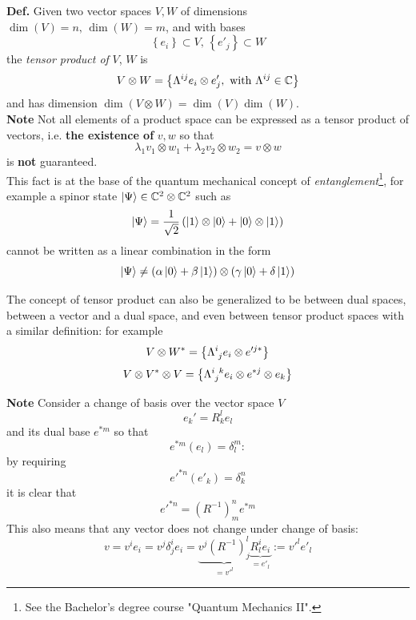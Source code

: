 \textbf{Def.} Given two vector spaces $V,W$ of dimensions $\dim(V)=n,\,\dim(W)=m$,
and with bases
$$\left\{e_i\right\}\subset V,\,\left\{e'_j\right\}\subset W$$
the \textit{tensor product of} $V$, $W$ is
$$V\otimes W = \left\{\Lambda\indices{^i^j}e_i\otimes e_j',\text{ with }
\Lambda^{ij}\in\mathbb{C}\right\}$$
and has dimension $\dim(V\otimes W) = \dim(V)\dim(W)$.\\
\textbf{Note} Not all elements of a product space can be expressed as a tensor
product of vectors, i.e. \textbf{the existence of} $v,w$ so that
$$\lambda_1v_1\otimes w_1 + \lambda_2v_2\otimes w_2 = v\otimes w$$
is \textbf{not} guaranteed.\\
This fact is at the base of the quantum mechanical
concept of \textit{entanglement}\footnote{
See the Bachelor's degree course "Quantum Mechanics II".},
for example a spinor state
$\ket{\Psi}\in\mathbb{C}^2\otimes\mathbb{C}^2$ such as
$$\ket{\Psi} = \frac{1}{\sqrt{2}}\left(\ket{1}\otimes\ket{0}+\ket{0}\otimes\ket{1}
\right)$$
cannot be written as a linear combination in the form
$$\ket{\Psi}\neq \left(\alpha\ket{0}+\beta\ket{1}\right)\otimes(\gamma\ket{0}+
\delta\ket{1})$$

The concept of tensor product can also be generalized to be between dual
spaces, between a vector and a dual space, and even between tensor product spaces
with a similar definition: for example
$$V\otimes W^* = \left\{\Lambda\indices{^i_j}e_i\otimes e'^{j*}\right\}$$
$$V\otimes V^*\otimes V = \left\{\Lambda\indices{^i_j^k}e_i\otimes e^{*j}\otimes
e_k\right\}$$

\textbf{Note} Consider a change of basis over the vector space $V$
$$e_k' = R^l_ke_l$$
and its dual base $e^{*m}$ so that
$$e^{*m}(e_l)=\delta^m_l:$$
by requiring
$$e'^{*n}(e'_k) = \delta^n_k$$
it is clear that
$$e'^{*n} = (R^{-1})^n_me^{*m}$$
This also means that any vector does not change under change of basis:
$$v = v^ie_i = v^j \delta_j^i e_i = \underbrace{v^j (R^{-1})_j^l}_{=v'^l}
\underbrace{R^i_l e_i}_{=e'_l}:=v'^le'_l$$

